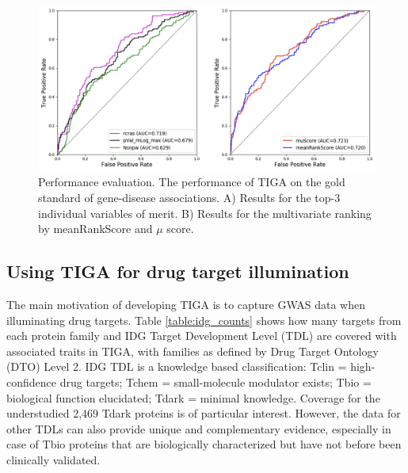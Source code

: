 \begin{figure}
	\includegraphics[width=\textwidth]{figures/tiga/FIG04_ROCs.png}
	\caption{Performance evaluation. The performance of TIGA on the gold standard of gene-disease associations. A) Results for the top-3 individual variables of merit. B) Results for the multivariate ranking by meanRankScore and $\mu$ score.}
	\label{fig:TIGA_rocs}
\end{figure}

\subsection{Using TIGA for drug target illumination}

The main motivation of developing TIGA is to capture GWAS data when illuminating drug targets. Table \ref{table:idg_counts} shows how many targets from each protein family and IDG Target Development Level (TDL) are covered with associated traits in TIGA, with families as defined by Drug Target Ontology\cite{Lin2017-yb} (DTO) Level 2. IDG TDL is a knowledge based classification: Tclin = high-confidence drug targets; Tchem = small-molecule modulator exists; Tbio = biological function elucidated; Tdark = minimal knowledge\cite{Oprea2018-cp}. Coverage for the understudied 2,469 Tdark proteins is of particular interest. However, the data for other TDLs can also provide unique and complementary evidence, especially in case of Tbio proteins that are biologically characterized but have not before been clinically validated.


